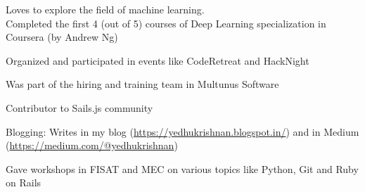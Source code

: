 \begin{cventries}
  \cventry
    {}
    {}
    {}
    {}
    {
      \begin{cvitems}
        \item {Loves to explore the field of machine learning. \\Completed the first 4 (out of 5) courses of Deep Learning specialization in Coursera (by Andrew Ng)}
        \item {Organized and participated in events like CodeRetreat and HackNight}
        \item {Was part of the hiring and training team in Multunus Software}
        \item {Contributor to  Sails.js community}
        \item {Blogging: Writes in my blog (\href{https://yedhukrishnan.blogspot.in/}{https://yedhukrishnan.blogspot.in/}) and in Medium (\href{https://medium.com/@yedhukrishnan}{https://medium.com/@yedhukrishnan}})
        \item {Gave workshops in FISAT and MEC on various topics like Python, Git and Ruby on Rails}
      \end{cvitems}
    }
\end{cventries}
